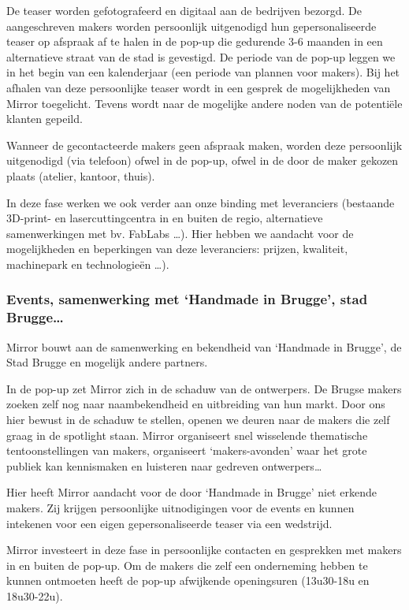De teaser worden gefotografeerd en digitaal aan de bedrijven bezorgd. De aangeschreven makers worden persoonlijk uitgenodigd hun gepersonaliseerde teaser op afspraak af te halen in de pop-up die gedurende 3-6 maanden in een alternatieve straat van de stad is gevestigd. De periode van de pop-up leggen we in het begin van een kalenderjaar (een periode van plannen voor makers).
Bij het afhalen van deze persoonlijke  teaser wordt in een gesprek de mogelijkheden van Mirror toegelicht. Tevens wordt naar de mogelijke andere noden van de potentiële klanten gepeild.

Wanneer de gecontacteerde makers geen afspraak maken, worden deze persoonlijk uitgenodigd (via telefoon) ofwel in de pop-up, ofwel in de door de maker gekozen plaats (atelier, kantoor, thuis).

In deze fase werken we ook verder aan onze binding met leveranciers (bestaande 3D-print- en lasercuttingcentra in en buiten de regio, alternatieve samenwerkingen met bv. FabLabs …). Hier hebben we aandacht voor de mogelijkheden en beperkingen van deze leveranciers: prijzen, kwaliteit, machinepark en technologieën …).

\subsubsection{Events, samenwerking met `Handmade in Brugge', stad Brugge…} %
\label{ssub:events_samenwerking_met_handmade_in_brugge_stad_brugge}
Mirror bouwt aan de samenwerking en bekendheid van `Handmade in Brugge', de Stad Brugge en mogelijk andere partners.

In de pop-up zet Mirror zich in de schaduw van de ontwerpers. De Brugse makers zoeken zelf nog naar naambekendheid en uitbreiding van hun markt. Door ons hier bewust in de schaduw te stellen, openen we deuren naar de makers die zelf graag in de spotlight staan. Mirror organiseert snel wisselende thematische tentoonstellingen van makers, organiseert ‘makers-avonden’ waar het grote publiek kan kennismaken en luisteren naar gedreven ontwerpers…

Hier heeft Mirror aandacht voor de door `Handmade in Brugge' niet erkende makers. Zij krijgen persoonlijke uitnodigingen voor de events en kunnen intekenen voor een eigen gepersonaliseerde teaser via een wedstrijd.

Mirror investeert in deze fase in persoonlijke contacten en gesprekken met makers in en buiten de pop-up. Om de makers die zelf een onderneming hebben te kunnen ontmoeten heeft de pop-up afwijkende openingsuren (13u30-18u en 18u30-22u).

